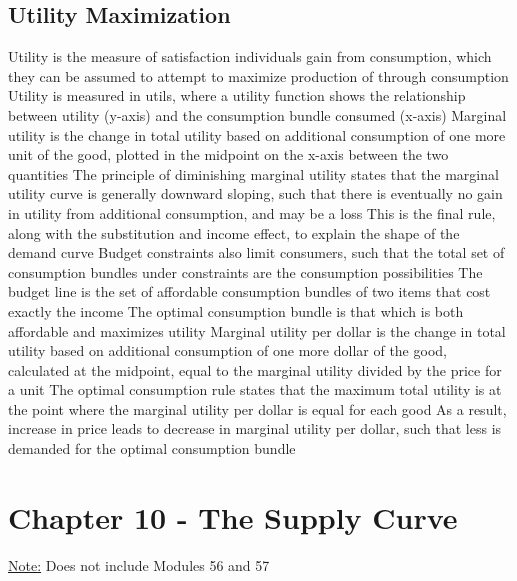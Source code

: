 \documentclass[11 pt, twoside]{article}
\newenvironment{outline*}
{
	\begin{outline}[enumerate]
	}
	{\end{outline}
}
\begin{document}
\subsection{Utility Maximization}
\begin{outline*}
\1 Utility is the measure of satisfaction individuals gain from consumption, which they can be assumed to attempt to maximize production of through consumption
\2 Utility is measured in utils, where a utility function shows the relationship between utility (y-axis) and the consumption bundle consumed (x-axis)
\2 Marginal utility is the change in total utility based on additional consumption of one more unit of the good, plotted in the midpoint on the x-axis between the two quantities
\1 The principle of diminishing marginal utility states that the marginal utility curve is generally downward sloping, such that there is eventually no gain in utility from additional consumption, and may be a loss
\2 This is the final rule, along with the substitution and income effect, to explain the shape of the demand curve
\1 Budget constraints also limit consumers, such that the total set of consumption bundles under constraints are the consumption possibilities
\2 The budget line is the set of affordable consumption bundles of two items that cost exactly the income
\1 The optimal consumption bundle is that which is both affordable and maximizes utility
\2 Marginal utility per dollar is the change in total utility based on additional consumption of one more dollar of the good, calculated at the midpoint, equal to the marginal utility divided by the price for a unit
\2 The optimal consumption rule states that the maximum total utility is at the point where the marginal utility per dollar is equal for each good
\2 As a result, increase in price leads to decrease in marginal utility per dollar, such that less is demanded for the optimal consumption bundle
\end{outline*}
\section{Chapter 10 - The Supply Curve}
\underline{Note:} Does not include Modules 56 and 57
\end{document}
